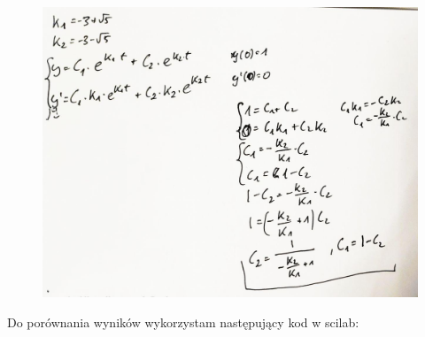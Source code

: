 \documentclass[12pt]{article}
\begin{document}
\begin{figure}[H]
\centering
    \includegraphics[scale=0.28]{./img/rozw-2.jpg}
\end{figure}

Do porównania wyników wykorzystam następujący kod w scilab:
\end{document}
